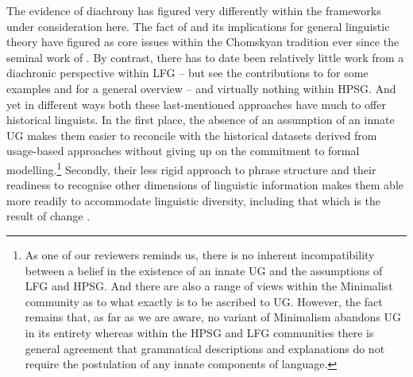 \documentclass[output=paper]{langsci/langscibook}
\begin{document}
The evidence of diachrony has figured very differently within the frameworks
under consideration here. The fact of  and its implications for
general linguistic theory have figured as core issues within the Chomskyan
tradition ever since the seminal work of \cite{Lightfoot79}. By contrast, there
has to date been relatively little work from a diachronic perspective within
\gls{LFG} -- but see the contributions to \cite{ButtKing01} for some examples
and \cite{BorjVinc17} for a general overview -- and virtually nothing within
HPSG. And yet in different ways both these last-mentioned approaches have much
to offer historical linguists. In the first place, the absence of an assumption
of an innate UG makes them easier to reconcile with the historical datasets
derived from usage-based approaches without giving up on the commitment to
formal modelling.\footnote{As one of our reviewers reminds us, there is no
inherent incompatibility between a belief in the existence of an innate UG and
the assumptions of \gls{LFG} and \gls{HPSG}. And there are also a range of views
within the Minimalist community as to what exactly is to be ascribed to UG.
However, the fact remains that, as far as we are aware, no variant of
Minimalism abandons UG in its entirety whereas within the \gls{HPSG} and
\gls{LFG} communities there is general agreement that grammatical descriptions
and explanations do not require the postulation of any innate components of
language.}  Secondly, their less rigid approach to phrase structure and their
readiness to recognise other dimensions of linguistic information makes them
able more readily to accommodate linguistic diversity, including that which is
the result of change \citep[475]{EvaLev2009}.
\end{document}
